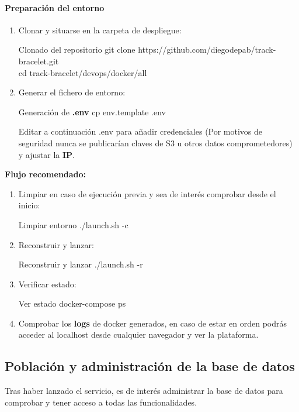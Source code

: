 \documentclass[12pt, a4paper]{article}
\begin{document}
\begin{umaappendices}
	\paragraph{Preparación del entorno}
	\begin{enumerate}
		\item Clonar y situarse en la carpeta de despliegue:
		\begin{Terminal}{Clonado del repositorio}
			git clone https://github.com/diegodepab/track-bracelet.git \\
			cd track-bracelet/devops/docker/all
		\end{Terminal}
		\item Generar el fichero de entorno:
		\begin{Terminal}{Generación de \textbf{.env}}
			cp env.template .env
		\end{Terminal}
		Editar a continuación .env para añadir credenciales (Por motivos de seguridad nunca se publicarían claves de S3 u otros datos comprometedores) y ajustar la \textbf{IP}.
	\end{enumerate}
	

	\textbf{Flujo recomendado:}
	\begin{enumerate}
		\item Limpiar en caso de ejecución previa y sea de interés comprobar desde el inicio:
		\begin{Terminal}{Limpiar entorno}
			./launch.sh -c
		\end{Terminal}
		\item Reconstruir y lanzar:
		\begin{Terminal}{Reconstruir y lanzar}
			./launch.sh -r
		\end{Terminal}
		\item Verificar estado:
		\begin{Terminal}{Ver estado}
			docker-compose ps
		\end{Terminal}
		\item Comprobar los \textbf{logs} de docker generados, en caso de estar en orden podrás acceder al localhost desde cualquier navegador y ver la plataforma. 
	\end{enumerate}
	
	\subsection{Población y administración de la base de datos}
	\label{sec:seed_db}
	
	Tras haber lanzado el servicio, es de interés administrar la base de datos para comprobar y tener acceso a todas las funcionalidades.
	

\end{umaappendices}
\end{document}
